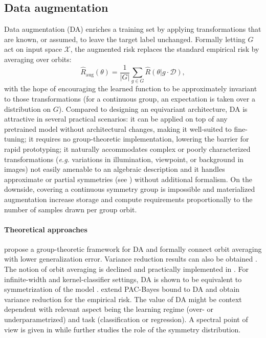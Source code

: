 \documentclass[mathematics,review,submit,moreauthors]{Definitions/mdpi}
\begin{document}
\subsection{Data augmentation}
Data augmentation (DA) enriches a training set by applying transformations that are known, or assumed, to leave the target label unchanged.
Formally letting $G$ act on input space $\mathcal{X}$, the augmented risk replaces the standard empirical risk by averaging over orbits:
$$
\hat R_{\mathrm{aug}}(\theta)=\frac{1}{|G|}\sum_{g\in G}\hat R(\theta |g\cdot \mathcal{D}),
$$
with the hope of encouraging the learned function to be approximately invariant to those transformations (for a continuous group, an expectation is taken over a distribution on $G$).
Compared to designing an equivariant architecture, DA is attractive in several practical scenarios: it can be applied on top of any pretrained model without architectural changes, making it well-suited to fine-tuning; it requires no group-theoretic implementation, lowering the barrier for rapid prototyping; it naturally accommodates complex or poorly characterized transformations (\textit{e.g.} variations in illumination, viewpoint, or background in images) not easily amenable to an algebraic description and it handles approximate or partial symmetries (see ) without additional formalism.
On the downside, covering a continuous symmetry group is impossible and materialized augmentation increase storage and compute requirements proportionally to the number of samples drawn per group orbit.

\paragraph{Theoretical approaches}
\citet{chen2020} propose a group-theoretic framework for DA and formally connect orbit averaging with lower generalization error.
Variance reduction results can also be obtained \citep{chen2020,dao2019p3icml}.
The notion of orbit averaging is declined and practically implemented in \citet{benton2020anips}.
For infinite-width and kernel-classifier settings, DA is shown to be equivalent to symmetrization of the model \citep{maass2024,dao2019p3icml}.
\citet{lyle2020} extend PAC-Bayes bound to DA and obtain variance reduction for the empirical risk.
The value of DA might be context dependent with relevant aspect being the learning regime (over- or underparametrized) and task (classification or regression).
A spectral point of view is given in \citet{lin2024} while \citet{lawrence2026} further studies the role of the symmetry distribution.
\end{document}
